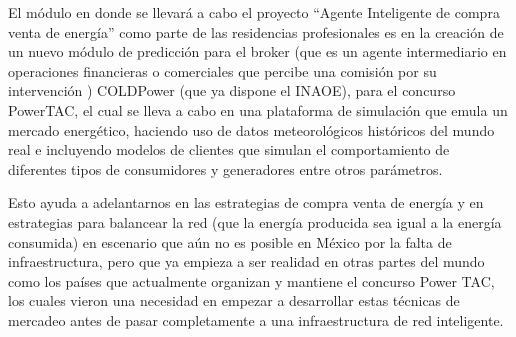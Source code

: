 El módulo en donde se llevará a cabo el proyecto ``Agente Inteligente de compra venta de energía'' como parte de las residencias profesionales es en la creación de un nuevo módulo de predicción para el broker (que es un agente intermediario en operaciones financieras o comerciales que percibe una comisión por su intervención \cite{RAEDiccionario2014}) 
COLDPower (que ya dispone el INAOE), para el concurso PowerTAC, el cual se lleva a cabo en una plataforma de simulación que emula un mercado energético, haciendo uso de datos meteorológicos históricos del mundo real e incluyendo modelos de clientes que simulan el comportamiento de diferentes tipos de consumidores y generadores entre otros parámetros. 

Esto ayuda a adelantarnos en las estrategias de compra venta de energía y en estrategias para balancear la red (que la energía producida sea igual a la energía consumida) en escenario que aún no es posible en México por la falta de infraestructura, pero que ya empieza a ser realidad en otras partes del mundo como los países que actualmente organizan y mantiene el concurso Power TAC, los cuales vieron una necesidad en empezar a desarrollar estas técnicas de mercadeo antes de pasar completamente a una infraestructura de red inteligente.